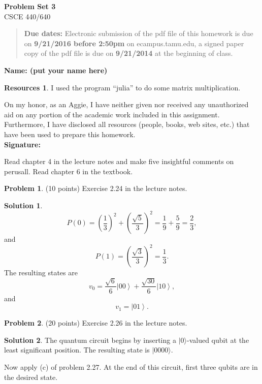 \documentclass{article}
\theoremstyle{definition}
\newtheorem{problem}{Problem}
\newtheorem*{solution}{Solution}
\newtheorem*{resources}{Resources}
\newcommand{\ket}[1]{|#1\rangle}
\newcommand{\name}[1]{\noindent\textbf{Name: #1}}
\newcommand{\honor}{\noindent On my honor, as an Aggie, I have neither
  given nor received any unauthorized aid on any portion of the
  academic work included in this assignment. Furthermore, I have
  disclosed all resources (people, books, web sites, etc.) that have
  been used to prepare this homework. \\[1ex]
 \textbf{Signature:} \underline{\hspace*{5cm}} }
\newcommand{\problemset}[1]{\begin{center}\textbf{Problem Set #1}\\ 
CSCE 440/640\end{center}}
\newcommand{\duedate}[2]{\begin{quote}\textbf{Due dates:} Electronic
    submission of the pdf file of this homework is due on \textbf{#1} on ecampus.tamu.edu, a signed paper copy
    of the pdf file is due on \textbf{#2} at the beginning of
    class. \end{quote} }
\begin{document}
\problemset{3}
\duedate{9/21/2016 before 2:50pm}{9/21/2014}
\name{ (put your name here)}
\begin{resources} I used the program ``julia'' to do some matrix multiplication.
\end{resources}
\honor

\newpage

\noindent Read chapter 4 in the lecture notes and make five insightful
comments on perusall. Read chapter 6 in the textbook. \medskip


\begin{problem}(10 points) 
Exercise 2.24 in the lecture notes. 
\end{problem}
\begin{solution}
$$P(0) = \left(\frac{1}{3}\right)^2 + \left(\frac{\sqrt 5}{3}\right)^2 =  \frac{1}{9} + \frac{5}{9} = \frac{2}{3},$$
and
$$P(1) = \left(\frac{\sqrt 3}{3}\right)^2 = \frac{1}{3}.$$
The resulting states are
$$v_0 = \frac{\sqrt 6}{6} \left| 00 \right\rangle + \frac{\sqrt{30}}{6} \left| 10 \right\rangle,$$
and
$$v_1 = \left| 01 \right\rangle.$$
\end{solution}

\begin{problem}(20 points) 
Exercise 2.26 in the lecture notes. 
\end{problem}
\begin{solution}
The quantum circuit begins by inserting a $\ket{0}$-valued qubit at the least significant position.
The resulting state is $\ket{0000}$.

Now apply (c) of problem 2.27.  At the end of this circuit, first three qubits are in the desired state.

\end{solution}
\end{document}
